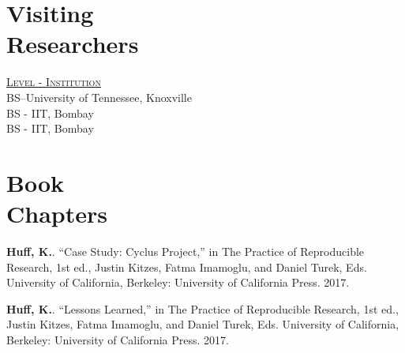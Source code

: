\documentclass[margin,line]{resume}
\begin{document}
\begin{resume}
    \section{\mysidestyle Visiting\\Researchers}
    \hfill\textsc{\underline{Level - Institution}}\\
    \hfill BS--University of Tennessee, Knoxville\\ 
    \hfill BS - IIT, Bombay \\
    \hfill BS - IIT, Bombay
               \vspace{-2mm}
    \section{\mysidestyle Book\\Chapters}
      \begin{bibenum} 
      \item \textbf{Huff, K.}. ``Case Study: Cyclus Project,'' in The Practice 
              of Reproducible Research, 1st ed., Justin Kitzes, Fatma Imamoglu, 
              and Daniel Turek, Eds. University of California, Berkeley: 
              University of California Press. 2017.
      \item \textbf{Huff, K.}. ``Lessons Learned,'' in The Practice of Reproducible 
              Research, 1st ed., Justin Kitzes, Fatma Imamoglu, and Daniel 
              Turek, Eds. University of California, Berkeley: University of 
              California Press. 2017.
      \end{bibenum}


\end{resume}
\end{document}
